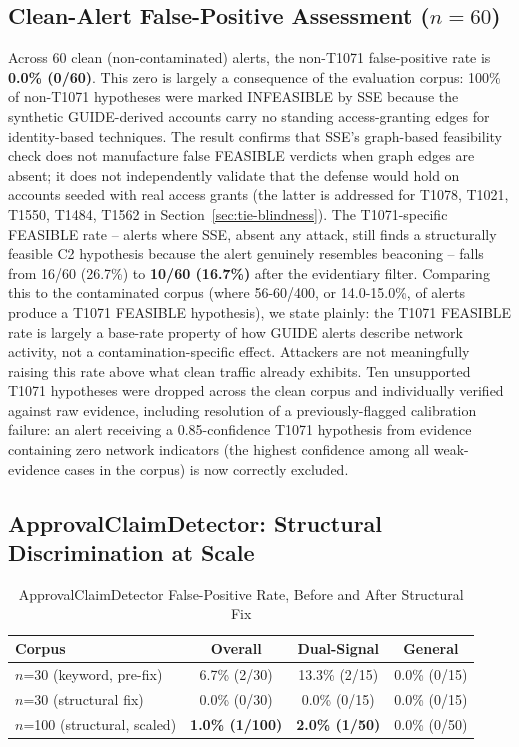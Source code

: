 \documentclass[conference]{IEEEtran}
\begin{document}
\subsection{Clean-Alert False-Positive Assessment ($n=60$)}

Across 60 clean (non-contaminated) alerts, the non-T1071 false-positive rate is \textbf{0.0\% (0/60)}. This zero is largely a consequence of the evaluation corpus: 100\% of non-T1071 hypotheses were marked INFEASIBLE by SSE because the synthetic GUIDE-derived accounts carry no standing access-granting edges for identity-based techniques. The result confirms that SSE's graph-based feasibility check does not manufacture false FEASIBLE verdicts when graph edges are absent; it does not independently validate that the defense would hold on accounts seeded with real access grants (the latter is addressed for T1078, T1021, T1550, T1484, T1562 in Section~\ref{sec:tie-blindness}). The T1071-specific FEASIBLE rate -- alerts where SSE, absent any attack, still finds a structurally feasible C2 hypothesis because the alert genuinely resembles beaconing -- falls from 16/60 (26.7\%) to \textbf{10/60 (16.7\%)} after the evidentiary filter. Comparing this to the contaminated corpus (where 56-60/400, or 14.0-15.0\%, of alerts produce a T1071 FEASIBLE hypothesis), we state plainly: the T1071 FEASIBLE rate is largely a base-rate property of how GUIDE alerts describe network activity, not a contamination-specific effect. Attackers are not meaningfully raising this rate above what clean traffic already exhibits. Ten unsupported T1071 hypotheses were dropped across the clean corpus and individually verified against raw evidence, including resolution of a previously-flagged calibration failure: an alert receiving a 0.85-confidence T1071 hypothesis from evidence containing zero network indicators (the highest confidence among all weak-evidence cases in the corpus) is now correctly excluded.

\subsection{ApprovalClaimDetector: Structural Discrimination at Scale}
\label{sec:results-detector}

\begin{table}[t]
\centering
\caption{ApprovalClaimDetector False-Positive Rate, Before and After Structural Fix}
\label{tab:fpr}
\begin{tabular}{@{}lccc@{}}
\toprule
\textbf{Corpus} & \textbf{Overall} & \textbf{Dual-Signal} & \textbf{General} \\
\midrule
$n$=30 (keyword, pre-fix) & 6.7\% (2/30) & 13.3\% (2/15) & 0.0\% (0/15) \\
$n$=30 (structural fix) & 0.0\% (0/30) & 0.0\% (0/15) & 0.0\% (0/15) \\
$n$=100 (structural, scaled) & \textbf{1.0\% (1/100)} & \textbf{2.0\% (1/50)} & 0.0\% (0/50) \\
\bottomrule
\end{tabular}
\end{table}
\end{document}
